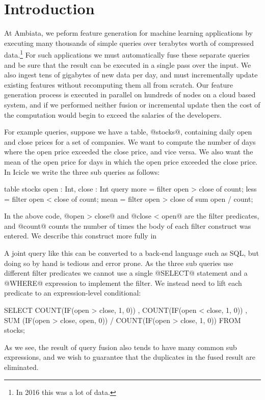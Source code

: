 \section{Introduction}
\label{s:Introduction}

At Ambiata, we peform feature generation for machine learning applications by executing many thousands of simple queries over terabytes worth of compressed data.\footnote{In 2016 this was a lot of data.}
For such applications we must automatically fuse these separate queries and be sure that the result can be executed in a single pass over the input.
We also ingest tens of gigabytes of new data per day, and must incrementally update existing features without recomputing them all from scratch.
Our feature generation process is executed in parallel on hundreds of nodes on a cloud based system, and if we performed neither fusion or incremental update then the cost of the computation would begin to exceed the salaries of the developers.

For example queries, suppose we have a table, @stocks@, containing daily open and close prices for a set of companies. We want to compute the number of days where the open price exceeded the close price, and vice versa. We also want the mean of the open price for days in which the open price exceeded the close price. In Icicle we write the three sub queries as follows:

\begin{code}
table stocks { open : Int, close : Int }
query 
  more  = filter open > close of count;
  less  = filter open < close of count;
  mean  = filter open > close of sum open / count;
\end{code}
In the above code, @open > close@ and @close < open@ are the filter predicates, and @count@ counts the number of times the body of each filter construct was entered. We describe this construct more fully in \REF

A joint query like this can be converted to a back-end language such as SQL, but doing so by hand is tedious and error prone. As the three sub queries use different filter predicates we cannot use a single @SELECT@ statement and a @WHERE@ expression to implement the filter. We instead need to lift each predicate to an expression-level conditional:
\begin{code}
  SELECT COUNT(IF(open > close, 1, 0))
       , COUNT(IF(open < close, 1, 0))
       , SUM  (IF(open > close, open, 0))
       / COUNT(IF(open > close, 1, 0))
  FROM stocks;
\end{code}
As we see, the result of query fusion also tends to have many common sub expressions, and we wish to guarantee that the duplicates in the fused result are eliminated.


